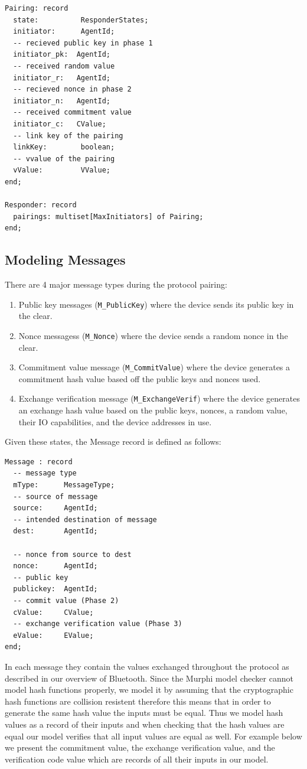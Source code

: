 \documentclass{acm_proc_article-sp}
\begin{document}
\begin{verbatim}
Pairing: record
  state:          ResponderStates;
  initiator:      AgentId;
  -- recieved public key in phase 1
  initiator_pk:  AgentId;
  -- received random value
  initiator_r:   AgentId;
  -- recieved nonce in phase 2
  initiator_n:   AgentId;
  -- received commitment value
  initiator_c:   CValue;
  -- link key of the pairing
  linkKey:        boolean;
  -- vvalue of the pairing
  vValue:         VValue;
end;
  
Responder: record
  pairings: multiset[MaxInitiators] of Pairing;
end;
\end{verbatim}

\subsection{Modeling Messages}
There are 4 major message types during the protocol pairing: 

\begin{enumerate}[1.]
    \item Public key messages (\texttt{M\_PublicKey}) where the device sends its public key in the clear.
    \item Nonce messagess (\texttt{M\_Nonce}) where the device sends a random nonce in the clear.
    \item Commitment value message (\texttt{M\_CommitValue}) where the device generates a commitment hash value based off the public keys and nonces used.
    \item Exchange verification message (\texttt{M\_ExchangeVerif}) where the device generates an exchange hash value based on the public keys, nonces, a random value, their IO capabilities, and the device addresses in use.
\end{enumerate}

Given these states, the Message record is defined as follows:

\begin{verbatim}
Message : record
  -- message type
  mType:      MessageType;
  -- source of message
  source:     AgentId;
  -- intended destination of message
  dest:       AgentId;
  
  -- nonce from source to dest
  nonce:      AgentId;
  -- public key
  publickey:  AgentId;
  -- commit value (Phase 2)
  cValue:     CValue;
  -- exchange verification value (Phase 3)
  eValue:     EValue;
end;
\end{verbatim}

In each message they contain the values exchanged throughout the protocol as described in our overview of Bluetooth. Since the Murphi model checker cannot model hash functions properly, we model it by assuming that the cryptographic hash functions are collision resistent therefore this means that in order to generate the same hash value the inputs must be equal. Thus we model hash values as a record of their inputs and when checking that the hash values are equal our model verifies that all input values are equal as well. For example below we present the commitment value, the exchange verification value, and the verification code value which are records of all their inputs in our model.
\end{document}
